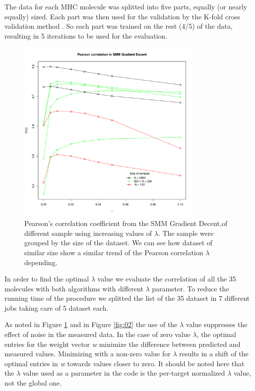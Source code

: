 \documentclass{bioinfo}
\begin{document}
\begin{application}
\par The data for each MHC molecule was splitted into five parts, equally (or nearly equally) sized. Each part was then used for the validation by the K-fold cross validation method \cite{wiki:crossval}. So each part was trained on the rest (4/5) of the data, resulting in 5 iterations to be used for the evaluation.
\begin{figure}[!tpb]
\centerline{\includegraphics[width=9cm]{fig/smm_l005_ppc_size.pdf}}
\caption{Pearson's correlation coefficient  from the SMM Gradient Decent,of different sample using increasing values of $\lambda$. The sample were grouped by the size of the dataset. We can see how dataset of similar size show a similar trend of the Pearson correlation $\lambda$ depending.}
\label{fig:01}
\end{figure}

\par In order to find the optimal $\lambda$ value we evaluate the correlation of all the 35 molecules with both algorithms with different $\lambda$ parameter. To reduce the running time of the procedure we splitted the list of the 35 dataset in 7 different jobs taking care of 5 dataset each. 
\par As noted in Figure \ref{fig:01} and in Figure \ref{fig:02} the use of the $\lambda$ value suppresses the effect of noise in the measured data. In the case of zero value $\lambda$, the optimal entries for the weight vector \textit{w} minimize the difference between predicted and measured values.  Minimizing with a non-zero value for $\lambda$ results in a shift of the optimal entries in \textit{w} towards values closer to zero. It should be noted here that the $\lambda$ value used as a parameter in the code is the per-target normalized $\lambda$ value, not the global one.


\end{application}
\end{document}
